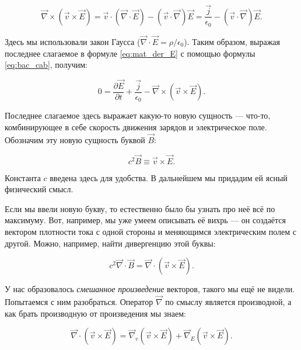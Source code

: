 \documentclass[a4paper,12pt]{article}
\newcommand{\pt}{\partial}
\newcommand{\eps}{\epsilon}
\newcommand{\vn}{\vec{\nabla}}
\begin{document}
\begin{equation}
  \label{eq:bac_cab}
  \vn \times \left( \vec{v} \times \vec{E} \right) = \vec{v} \cdot (\vn
  \cdot \vec{E}) - (\vec{v}\cdot \vn) \vec{E} = \frac{\vec{j}}{\eps_0}  -
  (\vec{v}\cdot \vn) \vec{E}.
\end{equation}

Здесь мы использовали закон Гаусса ($\vn \cdot \vec{E} = \rho/\eps_0$). Таким образом, выражая последнее слагаемое в формуле
\eqref{eq:mat_der_E} с помощью формулы \eqref{eq:bac_cab}, получим: 

\begin{equation}
  \label{eq:maxwell_eq_4_1}
  0 = \frac{\pt \vec{E}}{\pt t} + \frac{\vec{j}}{\eps_0} - \vn \times \left(
    \vec{v} \times \vec{E} \right).
\end{equation}

Последнее слагаемое здесь выражает какую-то новую сущность — что-то,
комбинирующее в себе скорость движения зарядов и электрическое
поле. Обозначим эту новую сущность буквой $\vec{B}$: 

\begin{equation}
  \label{eq:def_magnetic}
  c^2\vec{B} \equiv \vec{v} \times \vec{E}. 
\end{equation}

Константа $c$ введена здесь для удобства. В дальнейшем мы придадим ей
ясный физический смысл.

Если мы ввели новую букву, то естественно было бы узнать про неё всё
по максимуму. Вот, например, мы уже умеем описывать её вихрь — он
создаётся вектором плотности тока с одной стороны и меняющимся
электрическим полем с другой. Можно, например, найти дивергенцию этой
буквы:

\begin{equation}
  \label{eq:div_B_1}
  c^2\vn \cdot \vec{B} =  \vn \cdot \left( \vec{v} \times \vec{E} \right).
\end{equation}

У нас образовалось \textit{смешанное произведение} векторов, такого мы
ещё не видели. Попытаемся с ним разобраться. Оператор $\vn$ по смыслу
является производной, а как брать производную от произведения мы
знаем: 

\begin{equation}
  \label{eq:nabla_eq_1}
  \vn \cdot \left( \vec{v} \times \vec{E} \right) = \vn_v \left(
    \vec{v} \times \vec{E} \right)  + \vn_E \left( \vec{v} \times \vec{E} \right).
\end{equation}
\end{document}
